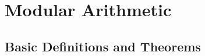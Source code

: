 
\section{Modular Arithmetic}
\label{sec:modular-arithmetic}

\subsection{Basic Definitions and Theorems}

